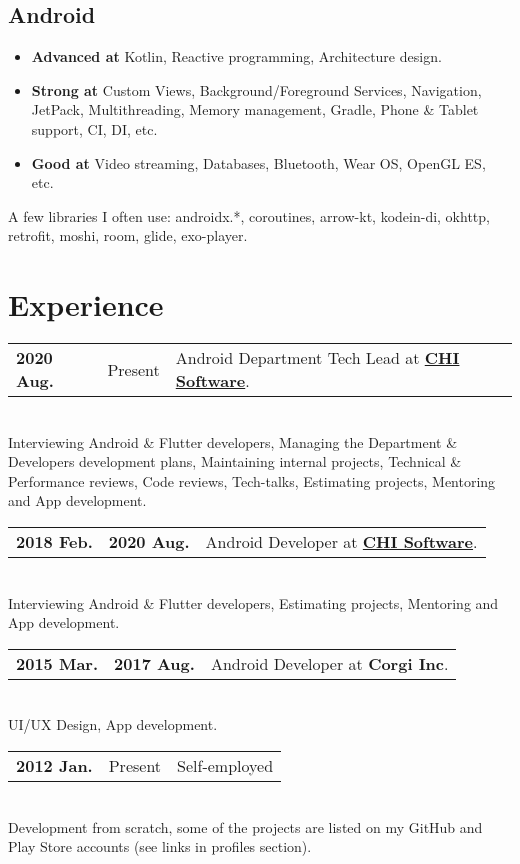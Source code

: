 \documentclass[a4paper]{article}
\begin{document}
	\subsection*{Android}
	\begin{multicols}{2}
	\begin{itemize}
		\item \textbf{Advanced at} Kotlin, Reactive programming, Architecture design.
		\item \textbf{Strong at} Custom Views, Background/Foreground Services, Navigation, JetPack, Multithreading, Memory management, Gradle, Phone \& Tablet support, CI, DI, etc.
		\item \textbf{Good at} Video streaming, Databases, Bluetooth, Wear OS, OpenGL ES, etc.
	\end{itemize}
	\end{multicols}
	
	{ \footnotesize
	A few libraries I often use: androidx.*, coroutines, arrow-kt, kodein-di, okhttp, retrofit, moshi, room, glide, exo-player.       
	}
	
	\section*{Experience}
	\begin{tabular}{@{}l@{\enspace--\enspace}ll}
		\textbf{2020 Aug.} & Present & Android Department Tech Lead at \href{https://chisw.com}{\textbf{CHI Software}}. \\
	\end{tabular} \\[0.2em]
	Interviewing Android \& Flutter developers, Managing the Department \& Developers development plans, Maintaining internal projects, Technical \& Performance reviews, Code reviews, Tech-talks, Estimating projects, Mentoring and App development. \\[0.4em]
	\begin{tabular}{@{}l@{\enspace--\enspace}ll}
		\textbf{2018 Feb.} & \textbf{2020 Aug.} & Android Developer at \href{https://chisw.com}{\textbf{CHI Software}}. \\
	\end{tabular} \\[0.2em]
	Interviewing Android \& Flutter developers, Estimating projects, Mentoring and App development.  \\[0.4em]   
	\begin{tabular}{@{}l@{\enspace--\enspace}ll}
		\textbf{2015 Mar.} & \textbf{2017 Aug.} & Android Developer at \textbf{Corgi Inc}. \\
	\end{tabular} \\[0.2em]
	UI/UX Design, App development.   \\[0.4em]   
	\begin{tabular}{@{}l@{\enspace--\enspace}ll}
		\textbf{2012 Jan.} & Present & Self-employed \\
	\end{tabular} \\[0.2em]
	Development from scratch, some of the projects are listed on my GitHub and Play Store accounts (see links in profiles section).   
\end{document}
